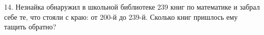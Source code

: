 14. Незнайка обнаружил в школьной библиотеке 239 книг по математике и забрал себе те, что стояли с краю: от 200-й до 239-й. Сколько книг пришлось ему тащить обратно?\\
